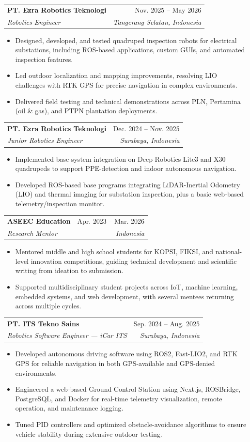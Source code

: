 \documentclass[a4paper,11pt]{article}
\makeatletter
\newcommand{\resumeItem}[1]{
  \item\small{
    {#1 \vspace{-2pt}}
  }
}
\newcommand{\resumeSubheading}[4]{
  \vspace{-2pt}\item
    \begin{tabular*}{0.97\textwidth}[t]{l@{\extracolsep{\fill}}r}
      \textbf{#1} & #2 \\
      \textit{\small#3} & \textit{\small #4} \\
    \end{tabular*}\vspace{-7pt}
}
\newcommand{\resumeItemListStart}{\begin{itemize}}
\newcommand{\resumeItemListEnd}{\end{itemize}\vspace{-5pt}}
\makeatother
\begin{document}
    \resumeSubheading
      {PT. Ezra Robotics Teknologi}{Nov. 2025 -- May 2026}
      {Robotics Engineer}{Tangerang Selatan, Indonesia}
      \resumeItemListStart
        \resumeItem{Designed, developed, and tested quadruped inspection robots for electrical substations, including ROS-based applications, custom GUIs, and automated inspection features.}
        \resumeItem{Led outdoor localization and mapping improvements, resolving LIO challenges with RTK GPS for precise navigation in complex environments.}
        \resumeItem{Delivered field testing and technical demonstrations across PLN, Pertamina (oil \& gas), and PTPN plantation deployments.}
      \resumeItemListEnd

    \resumeSubheading
      {PT. Ezra Robotics Teknologi}{Dec. 2024 -- Nov. 2025}
      {Junior Robotics Engineer}{Surabaya, Indonesia}
      \resumeItemListStart
        \resumeItem{Implemented base system integration on Deep Robotics Lite3 and X30 quadrupeds to support PPE-detection and indoor autonomous navigation.}
        \resumeItem{Developed ROS-based base programs integrating LiDAR-Inertial Odometry (LIO) and thermal imaging for substation inspection, plus a basic web-based telemetry/inspection monitor.}
      \resumeItemListEnd

    \resumeSubheading
      {ASEEC Education}{Apr. 2023 -- Mar. 2026}
      {Research Mentor}{Indonesia}
      \resumeItemListStart
        \resumeItem{Mentored middle and high school students for KOPSI, FIKSI, and national-level innovation competitions, guiding technical development and scientific writing from ideation to submission.}
        \resumeItem{Supported multidisciplinary student projects across IoT, machine learning, embedded systems, and web development, with several mentees returning across multiple cycles.}
      \resumeItemListEnd

    \resumeSubheading
      {PT. ITS Tekno Sains}{Sep. 2024 -- Aug. 2025}
      {Robotics Software Engineer --- iCar ITS}{Surabaya, Indonesia}
      \resumeItemListStart
        \resumeItem{Developed autonomous driving software using ROS2, Fast-LIO2, and RTK GPS for reliable navigation in both GPS-available and GPS-denied environments.}
        \resumeItem{Engineered a web-based Ground Control Station using Next.js, ROSBridge, PostgreSQL, and Docker for real-time telemetry visualization, remote operation, and maintenance logging.}
        \resumeItem{Tuned PID controllers and optimized obstacle-avoidance algorithms to ensure vehicle stability during extensive outdoor testing.}
      \resumeItemListEnd
\end{document}
